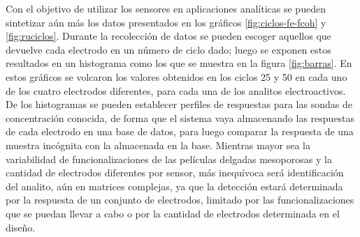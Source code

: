 {	Con el objetivo de utilizar los sensores en aplicaciones analíticas se pueden sintetizar aún más los datos presentados en los gráficos \ref{fig:ciclos-fe-fcoh} y \ref{fig:ruciclos}. Durante la recolección de datos se pueden escoger aquellos que devuelve cada electrodo en un número de ciclo dado; luego se exponen estos resultados en un histograma como los que se muestra en la figura \ref{fig:barras}. En estos gráficos se volcaron los valores obtenidos en los ciclos 25 y 50 en cada uno de los cuatro electrodos diferentes, para cada una de los analitos electroactivos. De los histogramas se pueden establecer perfiles de respuestas para las sondas de concentración conocida, de forma que el sistema vaya almacenando las respuestas de cada electrodo en una base de datos, para luego comparar la respuesta de una muestra incógnita con la almacenada en la base. Mientras mayor sea la variabilidad de funcionalizaciones de las películas delgadas mesoporosas y la cantidad de electrodos diferentes por sensor, más inequívoca será identificación del analito, aún en matrices complejas, ya que la detección estará determinada por la respuesta de un conjunto de electrodos, limitado por las funcionalizaciones que se puedan llevar a cabo o por la cantidad de electrodos determinada en el diseño.
   		

}
